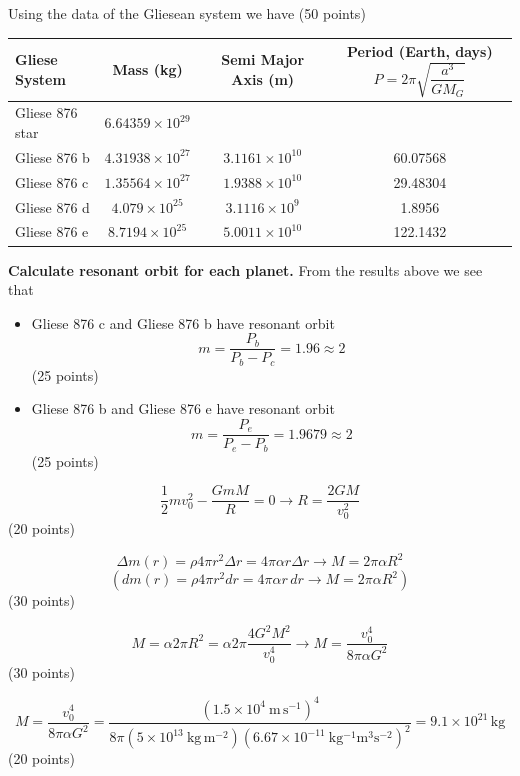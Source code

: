 Using the data of the Gliesean system we have
\hfill(50 points)

\begin{center}
\begin{tabular}{|l|c|c|c|}
\hline
\textbf{Gliese System} & \textbf{Mass (kg)} & \textbf{Semi Major Axis (m)}
  & \textbf{Period (Earth, days)} $P = 2\pi\sqrt{\dfrac{a^3}{GM_G}}$ \\
\hline
Gliese 876 star & $6.64359 \times 10^{29}$ & & \\
\hline
Gliese 876 b & $4.31938 \times 10^{27}$ & $3.1161 \times 10^{10}$ & 60.07568 \\
\hline
Gliese 876 c & $1.35564 \times 10^{27}$ & $1.9388 \times 10^{10}$ & 29.48304 \\
\hline
Gliese 876 d & $4.079 \times 10^{25}$ & $3.1116 \times 10^{9}$ & 1.8956 \\
\hline
Gliese 876 e & $8.7194 \times 10^{25}$ & $5.0011 \times 10^{10}$ & 122.1432 \\
\hline
\end{tabular}
\end{center}

\textbf{Calculate resonant orbit for each planet.}
From the results above we see that
\begin{itemize}
\item Gliese 876 c and Gliese 876 b have resonant orbit
  \[ m = \frac{P_b}{P_b - P_c} = 1.96 \approx 2 \]
  \hfill(25 points)
\item Gliese 876 b and Gliese 876 e have resonant orbit
  \[ m = \frac{P_e}{P_e - P_b} = 1.9679 \approx 2 \]
  \hfill(25 points)
\end{itemize}

\[
  \frac{1}{2}mv_0^2 - \frac{GmM}{R} = 0
  \rightarrow R = \frac{2GM}{v_0^2}
\]
\hfill(20 points)

\[
  \Delta m(r) = \rho4\pi r^2\Delta r = 4\pi\alpha r\Delta r
  \rightarrow M = 2\pi\alpha R^2
\]
\[
  \left(dm(r) = \rho4\pi r^2dr = 4\pi\alpha r\,dr
  \rightarrow M = 2\pi\alpha R^2\right)
\]
\hfill(30 points)

\[
  M = \alpha2\pi R^2 = \alpha2\pi\frac{4G^2M^2}{v_0^4}
  \rightarrow M = \frac{v_0^4}{8\pi\alpha G^2}
\]
\hfill(30 points)

\[
  M = \frac{v_0^4}{8\pi\alpha G^2}
    = \frac{(1.5\times10^4\ \mathrm{m\,s^{-1}})^4}
      {8\pi(5\times10^{13}\ \mathrm{kg\,m^{-2}})
       (6.67\times10^{-11}\ \mathrm{kg^{-1}m^3s^{-2}})^2}
    = 9.1\times10^{21}\,\mathrm{kg}
\]
\hfill(20 points)


